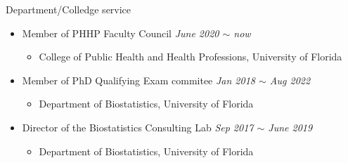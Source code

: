 \documentclass{resume} %
\begin{document}
\begin{rSection}{Department/Colledge service}
\begin{itemize}[noitemsep,topsep=0pt]

\item Member of PHHP Faculty Council
        \hfill {\em June 2020 $\sim$ now} 
        \begin{itemize}
        \item College of Public Health and Health Professions, University of Florida
        \end{itemize}

\item Member of PhD Qualifying Exam commitee 
        \hfill {\em Jan 2018 $\sim$ Aug 2022} 
        \begin{itemize}
        \item Department of Biostatistics, University of Florida
        \end{itemize}

\item Director of the Biostatistics Consulting Lab
        \hfill {\em Sep 2017 $\sim$ June 2019} 
        \begin{itemize}
        \item Department of Biostatistics, University of Florida
        \end{itemize}


\end{itemize}
\end{rSection}
\end{document}
